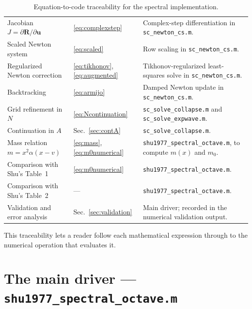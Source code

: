 \documentclass[11pt,a4paper]{article}
\begin{document}
\begin{table}[H]
\begin{tabular}{@{}p{4.6cm}p{2.2cm}p{7.4cm}@{}}
Jacobian $J=\partial\mathbf R/\partial\mathbf u$
& \eqref{eq:complexstep}
&
Complex-step differentiation \cite{squire1998}
in \texttt{sc\_newton\_cs.m}.
\\

Scaled Newton system
& \eqref{eq:scaled}
&
Row scaling in \texttt{sc\_newton\_cs.m}.
\\

Regularized Newton correction
& \eqref{eq:tikhonov}, \eqref{eq:augmented}
&
Tikhonov-regularized least-squares solve \cite{tikhonov1963}
in \texttt{sc\_newton\_cs.m}.
\\

Backtracking
& \eqref{eq:armijo}
&
Damped Newton update \cite{armijo1966} in
\texttt{sc\_newton\_cs.m}.
\\

Grid refinement in $N$
& \eqref{eq:Ncontinuation}
&
\texttt{sc\_solve\_collapse.m} and \texttt{sc\_solve\_expwave.m}.
\\

Continuation in $A$
& Sec.~\ref{sec:contA}
&
\texttt{sc\_solve\_collapse.m}.
\\

Mass relation $m=x^2\alpha(x-v)$
& \eqref{eq:mass}, \eqref{eq:m0numerical}
&
\texttt{shu1977\_spectral\_octave.m}, to compute $m(x)$ and $m_0$.
\\

Comparison with Shu's Table~1
& \eqref{eq:m0numerical}
&
\texttt{shu1977\_spectral\_octave.m}.
\\

Comparison with Shu's Table~2
& ---
&
\texttt{shu1977\_spectral\_octave.m}.
\\

Validation and error analysis
& Sec.~\ref{sec:validation}
&
Main driver; recorded in the numerical validation output.
\\

\bottomrule
\end{tabular}
\caption{Equation-to-code traceability for the spectral implementation.}
\label{tab:traceability}
\end{table}
This traceability lets a reader follow each mathematical expression
through to the numerical operation that evaluates it.

\section{The main driver --- \texttt{shu1977\_spectral\_octave.m}}
\label{sec:driver}
\end{document}
